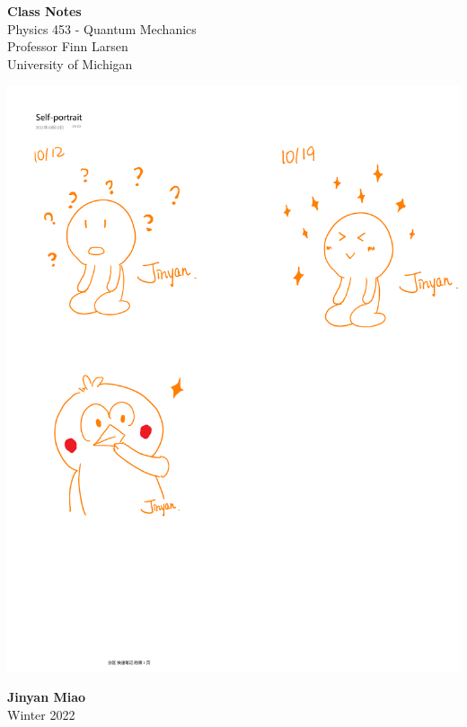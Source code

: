 \documentclass[11pt]{book}
\theoremstyle{break}
\theoremstyle{break}
\begin{document}
	\begin{titlepage}
		\begin{center}
			\vspace*{1cm}
			\Huge \color{red}
				\textbf{Class Notes}\\
			\vspace{0.5cm}			
			\Large \color{black}
				Physics 453 - Quantum Mechanics\\
				Professor Finn Larsen\\	
				University of Michigan\\
			\vspace{2cm}

			\includegraphics[scale=1.15]{hmm.pdf}
			
			
			\vspace{4cm}
			\LARGE
				\textbf{Jinyan Miao}\\
				\hfill\break
				\LARGE Winter 2022\\
			\vspace{1cm}

		\vspace*{\fill}
		\end{center}			
	\end{titlepage}
\end{document}
